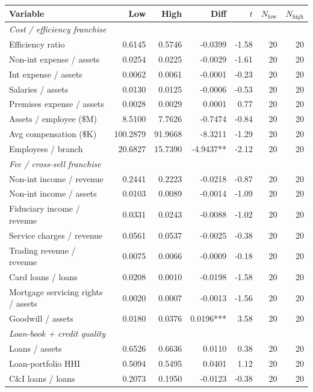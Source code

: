 \begin{tabular}{lrrrrrr}
\toprule
Variable & Low & High & Diff & $t$ & $N_{\text{low}}$ & $N_{\text{high}}$ \\
\midrule
\multicolumn{7}{l}{\emph{Cost / efficiency franchise}} \\
\midrule
Efficiency ratio & 0.6145 & 0.5746 & -0.0399 & -1.58 & 20 & 20 \\
Non-int expense / assets & 0.0254 & 0.0225 & -0.0029 & -1.61 & 20 & 20 \\
Int expense / assets & 0.0062 & 0.0061 & -0.0001 & -0.23 & 20 & 20 \\
Salaries / assets & 0.0130 & 0.0125 & -0.0006 & -0.53 & 20 & 20 \\
Premises expense / assets & 0.0028 & 0.0029 & 0.0001 & 0.77 & 20 & 20 \\
Assets / employee (\$M) & 8.5100 & 7.7626 & -0.7474 & -0.84 & 20 & 20 \\
Avg compensation (\$K) & 100.2879 & 91.9668 & -8.3211 & -1.29 & 20 & 20 \\
Employees / branch & 20.6827 & 15.7390 & -4.9437** & -2.12 & 20 & 20 \\
\midrule
\multicolumn{7}{l}{\emph{Fee / cross-sell franchise}} \\
\midrule
Non-int income / revenue & 0.2441 & 0.2223 & -0.0218 & -0.87 & 20 & 20 \\
Non-int income / assets & 0.0103 & 0.0089 & -0.0014 & -1.09 & 20 & 20 \\
Fiduciary income / revenue & 0.0331 & 0.0243 & -0.0088 & -1.02 & 20 & 20 \\
Service charges / revenue & 0.0561 & 0.0537 & -0.0025 & -0.38 & 20 & 20 \\
Trading revenue / revenue & 0.0075 & 0.0066 & -0.0009 & -0.18 & 20 & 20 \\
Card loans / loans & 0.0208 & 0.0010 & -0.0198 & -1.58 & 20 & 20 \\
Mortgage servicing rights / assets & 0.0020 & 0.0007 & -0.0013 & -1.56 & 20 & 20 \\
Goodwill / assets & 0.0180 & 0.0376 & 0.0196*** & 3.58 & 20 & 20 \\
\midrule
\multicolumn{7}{l}{\emph{Loan-book + credit quality}} \\
\midrule
Loans / assets & 0.6526 & 0.6636 & 0.0110 & 0.38 & 20 & 20 \\
Loan-portfolio HHI & 0.5094 & 0.5495 & 0.0401 & 1.12 & 20 & 20 \\
C\&I loans / loans & 0.2073 & 0.1950 & -0.0123 & -0.38 & 20 & 20 \\

\end{tabular}
